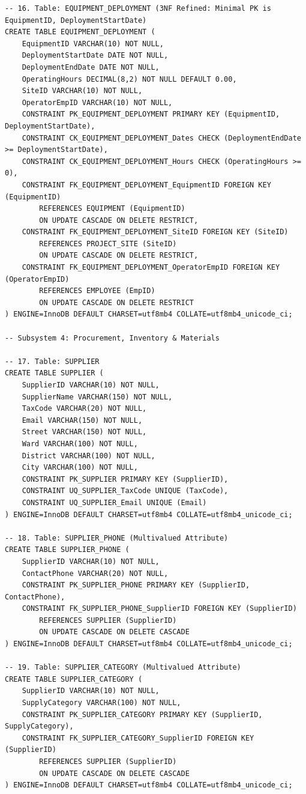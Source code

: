 \documentclass[a4paper,12pt]{report}
\begin{document}
\begin{lstlisting}
-- 16. Table: EQUIPMENT_DEPLOYMENT (3NF Refined: Minimal PK is EquipmentID, DeploymentStartDate)
CREATE TABLE EQUIPMENT_DEPLOYMENT (
    EquipmentID VARCHAR(10) NOT NULL,
    DeploymentStartDate DATE NOT NULL,
    DeploymentEndDate DATE NOT NULL,
    OperatingHours DECIMAL(8,2) NOT NULL DEFAULT 0.00,
    SiteID VARCHAR(10) NOT NULL,
    OperatorEmpID VARCHAR(10) NOT NULL,
    CONSTRAINT PK_EQUIPMENT_DEPLOYMENT PRIMARY KEY (EquipmentID, DeploymentStartDate),
    CONSTRAINT CK_EQUIPMENT_DEPLOYMENT_Dates CHECK (DeploymentEndDate >= DeploymentStartDate),
    CONSTRAINT CK_EQUIPMENT_DEPLOYMENT_Hours CHECK (OperatingHours >= 0),
    CONSTRAINT FK_EQUIPMENT_DEPLOYMENT_EquipmentID FOREIGN KEY (EquipmentID)
        REFERENCES EQUIPMENT (EquipmentID)
        ON UPDATE CASCADE ON DELETE RESTRICT,
    CONSTRAINT FK_EQUIPMENT_DEPLOYMENT_SiteID FOREIGN KEY (SiteID)
        REFERENCES PROJECT_SITE (SiteID)
        ON UPDATE CASCADE ON DELETE RESTRICT,
    CONSTRAINT FK_EQUIPMENT_DEPLOYMENT_OperatorEmpID FOREIGN KEY (OperatorEmpID)
        REFERENCES EMPLOYEE (EmpID)
        ON UPDATE CASCADE ON DELETE RESTRICT
) ENGINE=InnoDB DEFAULT CHARSET=utf8mb4 COLLATE=utf8mb4_unicode_ci;

-- Subsystem 4: Procurement, Inventory & Materials

-- 17. Table: SUPPLIER
CREATE TABLE SUPPLIER (
    SupplierID VARCHAR(10) NOT NULL,
    SupplierName VARCHAR(150) NOT NULL,
    TaxCode VARCHAR(20) NOT NULL,
    Email VARCHAR(150) NOT NULL,
    Street VARCHAR(150) NOT NULL,
    Ward VARCHAR(100) NOT NULL,
    District VARCHAR(100) NOT NULL,
    City VARCHAR(100) NOT NULL,
    CONSTRAINT PK_SUPPLIER PRIMARY KEY (SupplierID),
    CONSTRAINT UQ_SUPPLIER_TaxCode UNIQUE (TaxCode),
    CONSTRAINT UQ_SUPPLIER_Email UNIQUE (Email)
) ENGINE=InnoDB DEFAULT CHARSET=utf8mb4 COLLATE=utf8mb4_unicode_ci;

-- 18. Table: SUPPLIER_PHONE (Multivalued Attribute)
CREATE TABLE SUPPLIER_PHONE (
    SupplierID VARCHAR(10) NOT NULL,
    ContactPhone VARCHAR(20) NOT NULL,
    CONSTRAINT PK_SUPPLIER_PHONE PRIMARY KEY (SupplierID, ContactPhone),
    CONSTRAINT FK_SUPPLIER_PHONE_SupplierID FOREIGN KEY (SupplierID)
        REFERENCES SUPPLIER (SupplierID)
        ON UPDATE CASCADE ON DELETE CASCADE
) ENGINE=InnoDB DEFAULT CHARSET=utf8mb4 COLLATE=utf8mb4_unicode_ci;

-- 19. Table: SUPPLIER_CATEGORY (Multivalued Attribute)
CREATE TABLE SUPPLIER_CATEGORY (
    SupplierID VARCHAR(10) NOT NULL,
    SupplyCategory VARCHAR(100) NOT NULL,
    CONSTRAINT PK_SUPPLIER_CATEGORY PRIMARY KEY (SupplierID, SupplyCategory),
    CONSTRAINT FK_SUPPLIER_CATEGORY_SupplierID FOREIGN KEY (SupplierID)
        REFERENCES SUPPLIER (SupplierID)
        ON UPDATE CASCADE ON DELETE CASCADE
) ENGINE=InnoDB DEFAULT CHARSET=utf8mb4 COLLATE=utf8mb4_unicode_ci;


\end{lstlisting}
\end{document}
